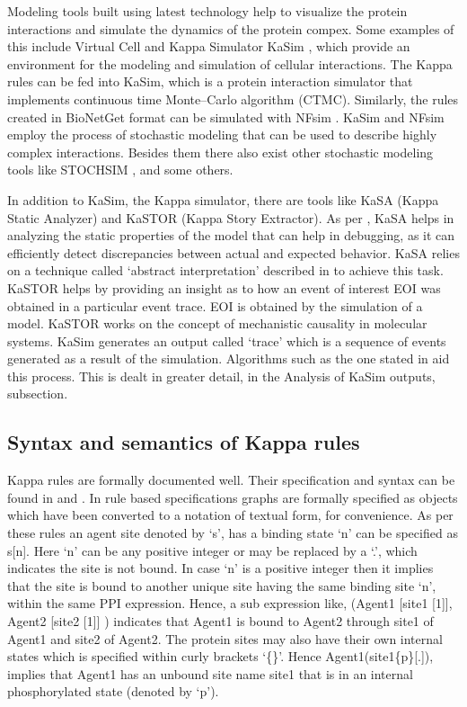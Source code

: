 \documentclass[msc,deptreport,ai]{infthesis}      %
\begin{document}
Modeling tools built using latest technology help to visualize the protein interactions and simulate the dynamics of the protein compex. Some examples of this include Virtual Cell \cite{vcell} and Kappa Simulator KaSim \cite{kasim}, which provide an environment for the modeling and simulation of cellular interactions. The Kappa rules can be fed into KaSim, which is a protein interaction simulator that implements continuous time Monte–Carlo algorithm (CTMC). Similarly, the rules created in BioNetGet \cite{bioNetGen} format can be simulated with NFsim \cite{nfsim}. KaSim and NFsim employ the process of stochastic modeling that can be used to describe highly complex interactions. Besides them there also exist other stochastic modeling tools like STOCHSIM \cite{stochsim}, and some others.

In addition to KaSim, the Kappa simulator, there are tools like KaSA (Kappa Static Analyzer) and KaSTOR (Kappa Story Extractor). As per \cite{kappaPlatform}, KaSA helps in analyzing the static properties of the model that can help in debugging, as it can efficiently detect discrepancies between actual and expected behavior. KaSA relies on a technique called `abstract interpretation' described in \cite{kappaPlatform} to achieve this task. KaSTOR helps by providing an insight as to how an event of interest EOI was obtained in a particular event trace. EOI is obtained by the simulation of a model. KaSTOR works on the concept of mechanistic causality in molecular systems. KaSim generates an output called `trace' which is a sequence of events generated as a result of the simulation. Algorithms such as the one stated in \cite{danos2012graphs} aid this process. This is dealt in greater detail, in the Analysis of KaSim outputs, subsection.

\subsection{Syntax and semantics of Kappa rules}
Kappa rules are formally documented well. Their specification and syntax can be found in \cite{kasim} and \cite{kappaURL}. In rule based specifications graphs are formally specified as objects which have been converted to a notation of textual form, for convenience. As per these rules an agent site denoted  by `s', has a binding state `n' can be specified as s[n]. Here `n' can be any positive integer or may be replaced by a `.', which indicates the site is not bound. In case `n' is a positive integer then it implies that the site is bound to another unique site having the same binding site `n', within the same PPI expression. Hence, a sub expression like, (Agent1 [site1 [1]], Agent2 [site2 [1]] ) indicates that Agent1 is bound to Agent2 through site1 of Agent1 and site2 of Agent2. The protein sites may also have their own internal states which is specified within curly brackets `\{\}'. Hence Agent1(site1\{p\}[.]), implies that Agent1 has an unbound site name site1 that is in an internal phosphorylated state (denoted by `p'). 
\end{document}
